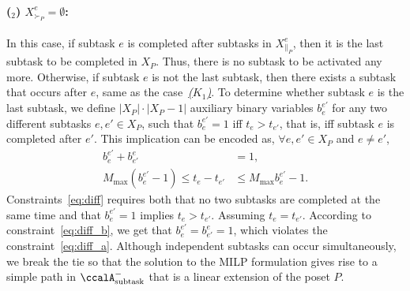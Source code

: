 \documentclass[Afour,sageh,times]{sagej}
\newcounter{mycounter}
\newcommand{\auto}[1]{\ccalA_{\textup{#1}}}
\begin{document}
{{{{{\paragraph{($_2$) $ X^e_{\succ_{P}} = \emptyset$:}\label{activation:b} In this case, if subtask $e$ is completed after  subtasks in  $X_{\|_P}^e$, then it is the last  subtask  to be completed in  $X_P$. Thus, there is no subtask to be activated any more. Otherwise, if subtask $e$ is not the last subtask, then there exists a subtask that occurs after $e$, same as the case~\hyperref[activation:a]{\it ($K_1$)}. To determine whether subtask $e$ is the last subtask, we define $|X_P|\cdot |X_P -1|$ auxiliary binary variables $b_{e}^{e'}$ for any two different subtasks  $e, e' \in X_P$,  such that $b_{e}^{e'}=1$  iff $t_{e} > t_{e'}$, that is, iff subtask $e$ is completed after $e'$. This implication can be encoded as, $\forall e, e' \in X_P $ and $e\neq e'$,
\begingroup\makeatletter\def\f@size{10}\check@mathfonts
\def\maketag@@@#1{\hbox{\m@th\normalsize\normalfont#1}}%
\begin{subequations}\label{eq:diff}
  \begin{align}
    b_e^{e'} + b_{e'}^e &  = 1, \label{eq:diff_a}\\
  M_{\text{max}} (b_{e}^{e'} - 1) \leq t_e -  t_{e'} & \leq M_{\text{max}} b_{e}^{e'} - 1. \label{eq:diff_b}
\end{align}
\end{subequations}
\endgroup
Constraints~\eqref{eq:diff} requires both that  no two subtasks are completed at the same time and that $b_e^{e'}=1$ implies $t_e > t_{e'}$. Assuming $t_e = t_{e'}$. According to constraint~\eqref{eq:diff_b}, we get that $b_e^{e'}=b_{e'}^{e}=1$, which violates the constraint~\eqref{eq:diff_a}. Although independent subtasks can occur simultaneously, we break the tie so that the solution to the MILP formulation gives rise to a simple path in $\auto{subtask}^-$ that is a linear extension of the poset $P$.%


}}}}}
\end{document}

